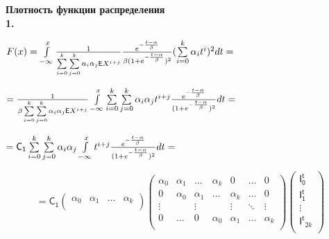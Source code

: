 \documentclass[a4paper,12pt]{article}
\begin{document}
\noindent\textbf{Плотность функции распределения}\\

\noindent\textbf{1.}

\begin{center}
$F(x) = \int\limits_{-\infty}^x {1\over{\sum\limits_{i = 0}^k}\sum\limits_{j=0}^k\alpha_i \alpha_j \mathsf{E}X^{i + j}} {e^{-{t - \alpha\over{\beta}}}\over{\beta(1 + e^{-{t - \alpha\over{\beta}}}})^2}(\sum\limits_{i = 0}^k \alpha_i t^i)^2 d t =$
\end{center}

\begin{center}
$= {1\over{\beta\sum\limits_{i = 0}^k}\sum\limits_{j=0}^k\alpha_i \alpha_j \mathsf{E}X^{i + j}} \int\limits_{-\infty}^x \sum\limits_{i = 0}^k \sum\limits_{j = 0}^k \alpha_i \alpha_j t^{i + j} {e^{-{t - \alpha\over{\beta}}}\over{(1 + e^{-{t - \alpha\over{\beta}}}})^2} d t =$
\end{center}

\begin{center}
    $= \mathsf{C_1} \sum\limits_{i = 0}^k \sum\limits_{j = 0}^k \alpha_i \alpha_j \int\limits_{-\infty}^x t^{i + j} {e^{-{t - \alpha\over{\beta}}}\over{(1 + e^{-{t - \alpha\over{\beta}}}})^2} d t = $
\end{center}

\begin{displaymath}
    = \mathsf{C_1} \begin{pmatrix}
        \alpha_0 & \alpha_1 & \ldots & \alpha_k \\
    \end{pmatrix} \begin{pmatrix}
        \alpha_0 & \alpha_1 & \ldots & \alpha_k & 0 & \ldots & 0 \\
        0 & \alpha_0 & \alpha_1 & \ldots & \alpha_k & \ldots & 0 \\
        \vdots &  & \vdots &  & \vdots & \ddots & \vdots\\
        0 & \ldots & 0 & \alpha_0 & \alpha_1 &\ldots & \alpha_k \\
    \end{pmatrix} \begin{pmatrix}
        \mathsf{I^t_0} \\ \mathsf{I^t_1} \\ \vdots \\ \mathsf{I^t}_{\mathsf{2}k} \\
    \end{pmatrix}
\end{displaymath}
\end{document}
